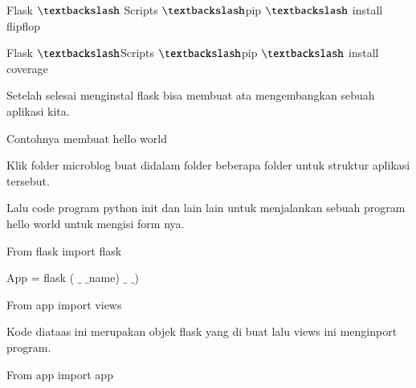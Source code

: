 \documentclass[a4paper,12pt]{report}
\begin{document}
\vspace{14pt}
\noindent 
{\fontsize{14pt}{14pt}\selectfont Flask $  \textbackslash  $ Scripts  $  \textbackslash  $pip $  \textbackslash  $ install flipflop \\} \par
\vspace{14pt}
\noindent 
{\fontsize{14pt}{14pt}\selectfont Flask $  \textbackslash  $Scripts $  \textbackslash  $pip $  \textbackslash  $ install coverage \\} \par
\vspace{14pt}
\vspace{14pt}
\noindent 
{\fontsize{14pt}{14pt}\selectfont Setelah selesai menginstal flask bisa membuat ata mengembangkan sebuah aplikasi kita.  \\} \par
\noindent 
{\fontsize{14pt}{14pt}\selectfont Contohnya membuat hello world \\} \par
\noindent 
{\fontsize{14pt}{14pt}\selectfont Klik folder microblog buat didalam folder beberapa folder untuk struktur aplikasi tersebut. \\} \par
\vspace{14pt}
\noindent 
{\fontsize{14pt}{14pt}\selectfont Lalu code program python init dan lain lain untuk menjalankan sebuah program hello world untuk mengisi form nya. \\} \par
\noindent 
{\fontsize{14pt}{14pt}\selectfont From flask import flask \\} \par
\vspace{14pt}
\noindent 
{\fontsize{14pt}{14pt}\selectfont App = flask ( $  \_  $ $  \_  $name) $  \_  $ $  \_  $) \\} \par
\vspace{14pt}
\noindent 
{\fontsize{14pt}{14pt}\selectfont From app import views \\} \par
\vspace{14pt}
\noindent 
{\fontsize{14pt}{14pt}\selectfont Kode diataas ini merupakan objek flask yang di buat lalu views ini menginport program. \\} \par
\vspace{14pt}
\noindent 
{\fontsize{14pt}{14pt}\selectfont From app import app \\} \par
\end{document}
